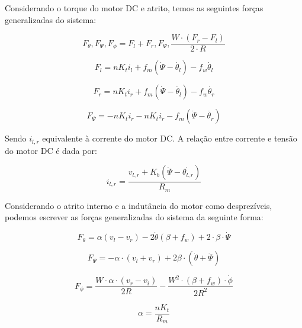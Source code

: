\documentclass[12pt]{article}
\begin{document}
Considerando o torque do motor DC e atrito, temos as seguintes forças generalizadas do sistema:

\begin{equation*}
    F_{\theta}, F_{\Psi},F_{\phi} = F_l + F_r, F_{\Psi}, \frac{W\cdot ( F_r - F_l)}{2 \cdot R} 
\end{equation*}

\begin{equation*}
    F_l = n K_t i_l + f_m(\dot{\Psi} - \dot{\theta_l}) - f_w \dot{\theta_l} 
\end{equation*}

\begin{equation*}
     F_r = n K_t i_r + f_m(\dot{\Psi} - \dot{\theta_l}) - f_w \dot{\theta_r} 
\end{equation*}


\begin{equation*}
     F_{\Psi} = -n K_t i_r -n K_t i_r - f_m(\dot{\Psi} - \dot{\theta_r})
\end{equation*}

Sendo $i_{l,r}$ equivalente à corrente do motor DC. A relação entre corrente e tensão do motor DC é dada por:

\begin{equation}
    i_{l,r} = \frac{v_{l,r} + K_b(\dot{\Psi} - \dot{\theta_{l,r}})}{R_m}
\end{equation}

\quad Considerando o atrito interno e a indutância do motor como desprezíveis, podemos escrever as forças generalizadas do sistema da seguinte forma:

\begin{equation*}
    F_{\theta} = \alpha(v_l - v_r) - 2\dot{\theta} (\beta + f_w)  + 2 \cdot \beta \cdot  \dot{\Psi}                               
\end{equation*}

\begin{equation}
    F_{\Psi} = - \alpha \cdot (v_l + v_r) + 2\beta \cdot (\dot{\theta} + \dot{\Psi})
\end{equation}


\begin{equation*}
    F_{\phi} = \frac{W \cdot \alpha \cdot (v_r - v_i)}{2R} - \frac{W^2 \cdot (\beta + f_w) \cdot \dot{\phi}}{2R^2}
\end{equation*}

\begin{equation*}
    \alpha = \frac{n K_t}{R_m}
\end{equation*}
\end{document}
